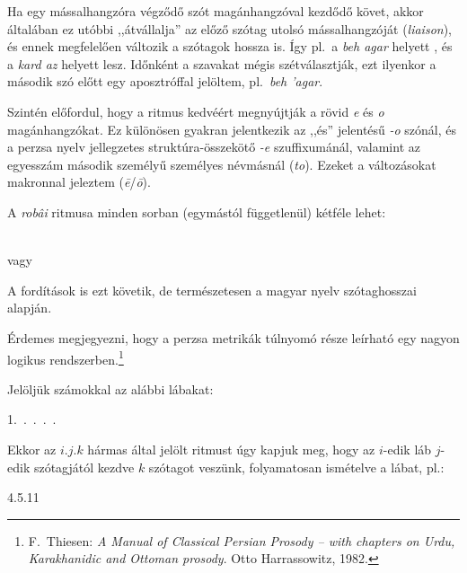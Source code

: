 Ha egy mássalhangzóra végződő szót magánhangzóval kezdődő követ, akkor
általában ez utóbbi ,,átvállalja'' az előző szótag utolsó
mássalhangzóját (\emph{liaison}), és ennek megfelelően változik a
szótagok hossza is. Így pl.~a \emph{beh agar} \metra{\m\b\m} helyett
\metra{\b\b\m}, és a \emph{kard az} \metra{\m\b\m} helyett
\metra{\m\m} lesz. Időnként a szavakat mégis szétválasztják, ezt
ilyenkor a második szó előtt egy aposztróffal jelöltem, pl.~\emph{beh
'agar}.

Szintén előfordul, hogy a ritmus kedvéért megnyújtják a rövid \emph{e}
és \emph{o} magánhangzókat. Ez különösen gyakran jelentkezik az ,,és''
jelentésű \emph{-o} szónál, és a perzsa nyelv jellegzetes
struktúra-összekötő \emph{-e} szuffixumánál, valamint az egyesszám
második személyű személyes névmásnál (\emph{to}). Ezeket a
változásokat makronnal jeleztem (\emph{ē}/\emph{ō}).

A \emph{robâi} ritmusa minden sorban (egymástól függetlenül) kétféle
lehet:
\begin{center}
  {\large\metra{\m\m\mbb\s\m\m\mbb\s\m\m\mbb\s\m\cc}}\\
  vagy\\
  {\large\metra{\m\m\mbb\s\m\b\m\b\s\m\m\mbb\s\m\cc}}
\end{center}

A fordítások is ezt követik, de természetesen a magyar nyelv
szótaghosszai alapján.

\begin{center}
\end{center}

Érdemes megjegyezni, hogy a perzsa metrikák túlnyomó része leírható
egy nagyon logikus rendszerben.\footnote{F.~Thiesen: \emph{A Manual of
    Classical Persian Prosody -- with chapters on Urdu, Karakhanidic
    and Ottoman prosody}. Otto Harrassowitz, 1982.}

Jelöljük számokkal az alábbi lábakat:
\begin{center}
  1.~\metra{\b\m\m}.~\metra{\b\m\m\m}.~\metra{\b\b\m\m}.~\metra{\b\m\b\m\b\b\m\m}.~\metra{\m\m\b\b\m\b\m\b}
\end{center}

Ekkor az $i.j.k$ hármas által jelölt ritmust úgy kapjuk meg, hogy az
$i$-edik láb $j$-edik szótagjától kezdve $k$ szótagot veszünk,
folyamatosan ismételve a lábat, pl.:
\begin{center}
4{.}5{.}11 \metra{\b\b\m\m\s\b\m\b\m\s\b\b\m}
\end{center}


